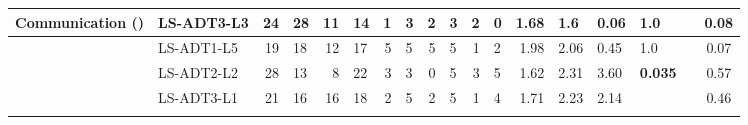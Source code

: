 \begin{table*}[t!]
{\begin{tabular}{@{}llrlrlrlrlrlrllllc@{}}
Communication (\hypothesis{\hypoCommunicationTool})                       

& LS-ADT3-L3 & 24                                 & 28                        & 11                          & 14                           & 1                                     & 3                           & 2  & 3  & 2 & 0 & 1.68 & 1.6  & 0.06& 1.0   &&0.08\\\midrule


& LS-ADT1-L5 & 19                                 & 18                        & 12                          & 17                           & 5                                     & 5                           & 5  & 5  & 1 & 2 & 1.98 & 2.06 & 0.45& 1.0   & &0.07\\
& LS-ADT2-L2 & 28                                 & 13                        & 8                           & 22                           & 3                                     & 3                           & 0  & 5  & 3 & 5 & 1.62 & 2.31 & 3.60 & \textbf{0.035}  & & 0.57\\
& LS-ADT3-L1 & 21                                 & 16                        & 16                          & 18                           & 2                                     & 5                           & 2  & 5  & 1 & 4 & 1.71 & 2.23 & 2.14 &  &    &0.46\\ \midrule



\end{tabular}}
\end{table*}
